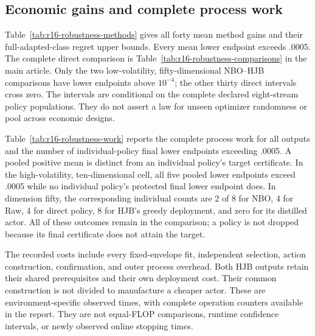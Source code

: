 

\subsection{Economic gains and complete process work}
Table~\ref{tab:r16-robustness-methods} gives all forty mean method gains and
their full-adapted-class regret upper bounds. Every mean lower endpoint
exceeds .0005. The complete direct comparison is
Table~\ref{tab:r16-robustness-comparisons} in the main article. Only the two
low-volatility, fifty-dimensional NBO--HJB comparisons have lower endpoints
above $10^{-4}$; the other thirty direct intervals cross zero. The intervals
are conditional on the complete declared eight-stream policy populations.
They do not assert a law for unseen optimizer randomness or pool across
economic designs.



Table~\ref{tab:r16-robustness-work} reports the complete process work for
all outputs and the number of individual-policy final lower endpoints
exceeding .0005. A pooled positive mean is distinct from an individual
policy's target certificate. In the high-volatility, ten-dimensional cell,
all five pooled lower endpoints exceed .0005 while no individual policy's
protected final lower endpoint does. In dimension fifty, the corresponding
individual counts are 2 of 8 for NBO, 4 for Raw, 4 for direct policy, 8 for
HJB's greedy deployment, and zero for its distilled actor. All of these
outcomes remain in the comparison; a policy is not dropped because its
final certificate does not attain the target.

The recorded costs include every fixed-envelope fit, independent selection,
action construction, confirmation, and outer process overhead. Both HJB
outputs retain their shared prerequisites and their own deployment cost.
Their common construction is not divided to manufacture a cheaper actor.
These are environment-specific observed times, with complete operation
counters available in the report. They are not equal-FLOP comparisons,
runtime confidence intervals, or newly observed online stopping times.


